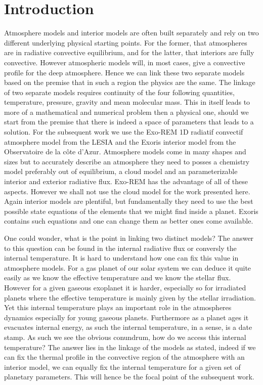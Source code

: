 \section{Introduction}

Atmosphere models and interior models are often built separately and rely on two different underlying physical starting points. For the former, that atmospheres are in radiative convective equilibrium, and for the latter, that interiors are fully convective. However atmospheric models will, in most cases, give a convective profile for the deep atmosphere. Hence we can link these two separate models based on the premise that in such a region the physics are the same. The linkage of two separate models requires continuity of the four following quantities, temperature, pressure, gravity and mean molecular mass. This in itself leads to more of a mathematical and numerical problem then a physical one, should we start from the premise that there is indeed a space of parameters that leads to a solution. For the subsequent work we use the Exo-REM 1D radiatif convectif atmosphere model from the LESIA and the Exoris interior model from the Observatoire de la côte d'Azur. Atmosphere models come in many shapes and sizes but to accurately describe an atmosphere they need to posses a chemistry model preferably out of equilibrium, a cloud model and an parameterizable interior and exterior radiative flux. Exo-REM has the advantage of all of these aspects. However we shall not use the cloud model for the work presented here. Again interior models are plentiful, but fundamentally they need to use the best possible state equations of the elements that we might find inside a planet. Exoris contains such equations and one can change them as better ones come available. \par
One could wonder, what is the point in linking two distinct models? The answer to this question can be found in the internal radiative flux or conversly the internal temperature. It is hard to understand how one can fix this value in atmosphere models. For a gas planet of our solar system we can deduce it quite easily as we know the effective temperature and we know the stellar flux. However for a given gaseous exoplanet it is harder, especially so for irradiated planets where the effective temperature is mainly given by the stellar irradiation. Yet this internal temperature plays an important role in the atmospheres dynamics especially for young gaseous planets. Furthermore as a planet ages it evacuates internal energy, as such the internal temperature, in a sense, is a date stamp. As such we see the obvious conundrum, how do we access this internal temperature? The answer lies in the linkage of the models as stated, indeed if we can fix the thermal profile in the convective region of the atmosphere with an interior model, we can equally fix the internal temperature for a given set of planetary parameters. This will hence be the focal point of the subsequent work.

